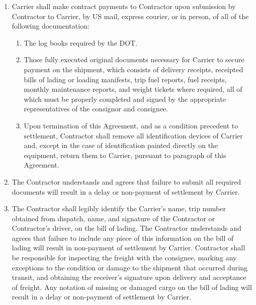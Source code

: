 \begin{enumerate}
    \item Carrier shall make contract payments to Contractor upon
    submission by Contractor to Carrier, by US mail, express courier, or in
    person, of all of the following documentation:
    \begin{enumerate}
        \item The log books required by the DOT.
        
        \item Those fully executed original documents necessary for Carrier
        to secure payment on the shipment, which consists of delivery
        receipts, receipted bills of lading or loading manifests, trip fuel
        reports, fuel receipts, monthly maintenance reports, and weight
        tickets where required, all of which must be properly completed and
        signed by the appropriate representatives of the consignor and
        consignee.
        
        \item Upon termination of this Agreement, and as a condition
        precedent to settlement, Contractor shall remove all identification
        devices of Carrier and, except in the case of identification
        painted directly on the equipment, return them to Carrier, pursuant
        to paragraph
        of this Agreement.
    \end{enumerate}

    \item The Contractor understands and agrees that failure to submit all
    required documents will result in a delay or non-payment of settlement
    by Carrier.

    \item The Contractor shall legibly identify the Carrier's name, trip
    number obtained from dispatch, name, and signature of the Contractor or
    Contractor's driver, on the bill of lading. The Contractor understands
    and agrees that failure to include any piece of this information on the
    bill of lading will result in non-payment of settlement by Carrier.
    Contractor shall be responsible for inspecting the freight with the
    consignee, marking any exceptions to the condition or damage to the
    shipment that occurred during transit, and obtaining the receiver's
    signature upon delivery and acceptance of freight. Any notation of
    missing or damaged cargo on the bill of lading will result in a delay
    or non-payment of settlement by Carrier.


\end{enumerate}
